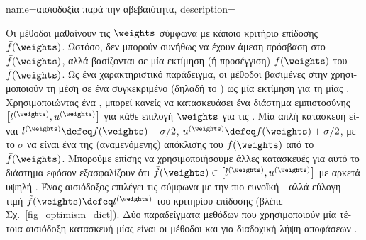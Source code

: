 {name={\foreignlanguage{greek}{αισιοδοξία παρά την αβεβαιότητα}},
	description={\foreignlanguage{greek}{Οι μέθοδοι}  
		\foreignlanguage{greek}{μαθαίνουν τις}  $\weights$ \foreignlanguage{greek}{σύμφωνα με κάποιο κριτήριο 
		επίδοσης $\bar{f}(\weights)$. Ωστόσο, δεν μπορούν συνήθως να έχουν άμεση πρόσβαση στο $\bar{f}(\weights)$, αλλά βασίζονται σε μία 
		εκτίμηση (ή προσέγγιση) $f(\weights)$ του $\bar{f}(\weights)$. Ως ένα χαρακτηριστικό παράδειγμα, οι μέθοδοι βασιμένες στην} 
		 \foreignlanguage{greek}{χρησιμοποιούν τη μέση}  \foreignlanguage{greek}{σε ένα συγκεκριμένο} 
		 \foreignlanguage{greek}{(δηλαδή το} ) \foreignlanguage{greek}{ως μία εκτίμηση για τη}  
		 \foreignlanguage{greek}{μίας} . \foreignlanguage{greek}{Χρησιμοποιώντας ένα} 
		, \foreignlanguage{greek}{μπορεί κανείς να κατασκευάσει ένα διάστημα εμπιστοσύνης  
		$\big[ l^{(\weights)},  u^{(\weights)} \big]$ για κάθε επιλογή $\weights$ για τις} . \foreignlanguage{greek}{Μία 
		απλή κατασκευή είναι $l^{(\weights)} \defeq f(\weights) - \sigma/2$, $u^{(\weights)} \defeq f(\weights)+ \sigma/2$, 
	    	με το $\sigma$ να είναι ένα}  \foreignlanguage{greek}{της (αναμενόμενης) απόκλισης του $f(\weights)$ από το 
		$\bar{f}(\weights)$. Μπορούμε επίσης να χρησιμοποιήσουμε άλλες κατασκευές για αυτό το διάστημα εφόσον εξασφαλίζουν ότι 
		$\bar{f}(\weights) \in\big[ l^{(\weights)},  u^{(\weights)} \big]$ με αρκετά υψηλή} . \foreignlanguage{greek}{Ένας 
		αισιόδοξος επιλέγει τις}  \foreignlanguage{greek}{σύμφωνα με την πιο ευνοϊκή—αλλά εύλογη—τιμή 
		$\tilde{f}(\weights) \defeq  l^{(\weights)}$ του κριτηρίου επίδοσης (βλέπε Σχ.\ \ref{fig_optimism_dict}). Δύο παραδείγματα μεθόδων} 
		 \foreignlanguage{greek}{που χρησιμοποιούν μία τέτοια αισιόδοξη κατασκευή μίας}  
		\foreignlanguage{greek}{είναι οι μέθοδοι}  \cite[\foreignlanguage{greek}{Κεφ.} 11]{ShalevMLBook} 
		\foreignlanguage{greek}{και}  \foreignlanguage{greek}{για διαδοχική λήψη αποφάσεων} \cite[\foreignlanguage{greek}{Ενότητα} 2.2]{Bubeck2012}. 
		\begin{figure}[H]
			\begin{center}

\end{center}
\end{figure}}}
